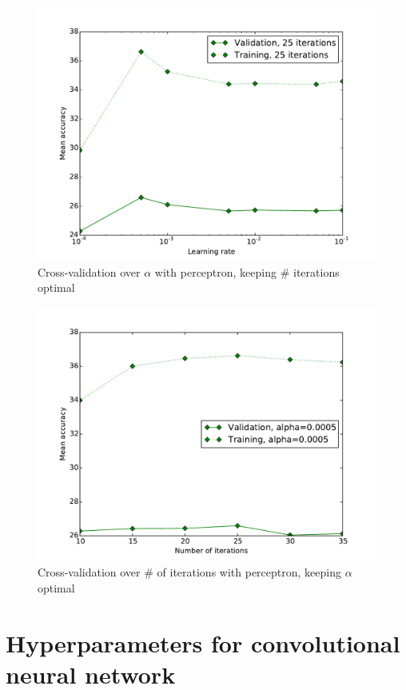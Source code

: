 \documentclass{acm_proc_article-sp}
\begin{document}
\begin{figure}[h!]
	\centering
	\includegraphics[width=\linewidth]{perceptron_learningrate}
  	\caption{Cross-validation over $\alpha$ with perceptron, keeping \# iterations optimal}
  	\label{fig:perc-learningrate}
\end{figure}
\begin{figure}[h!]
	\centering
	\includegraphics[width=\linewidth]{perceptron_iterations}
  	\caption{Cross-validation over \# of iterations with perceptron, keeping $\alpha$ optimal}
  	\label{fig:perc-iterations}
\end{figure}

\section{Hyperparameters for convolutional neural network}
\label{sec:convnet-settings}


\balancecolumns
\end{document}
